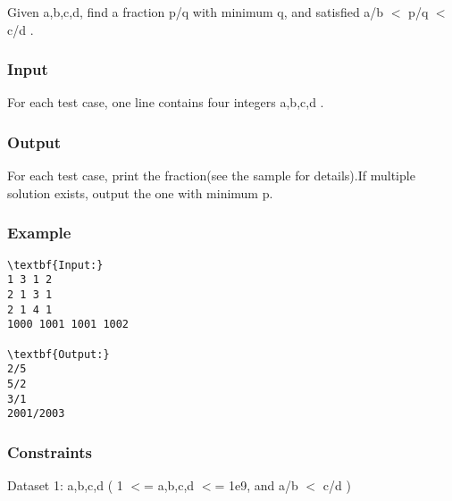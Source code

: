 







   Given a,b,c,d, find a fraction p/q with minimum q, and satisfied a/b $<$ p/q $<$ c/d .  

\subsubsection{   Input  }

   For each test case, one line contains four integers a,b,c,d .  

\subsubsection{   Output  }

   For each test case, print the fraction(see the sample for details).If multiple solution exists, output the one with minimum p.  

\subsubsection{   Example  }
\begin{verbatim}
\textbf{Input:}
1 3 1 2
2 1 3 1
2 1 4 1
1000 1001 1001 1002

\textbf{Output:}
2/5
5/2
3/1
2001/2003
\end{verbatim}

\subsubsection{   Constraints  }

   Dataset 1: a,b,c,d ( 1 $<$= a,b,c,d $<$= 1e9, and a/b $<$ c/d )  


